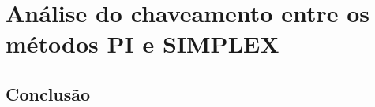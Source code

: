 \section{Análise do chaveamento entre os métodos PI e SIMPLEX}

\subsection{Conclusão}


    
\newpage